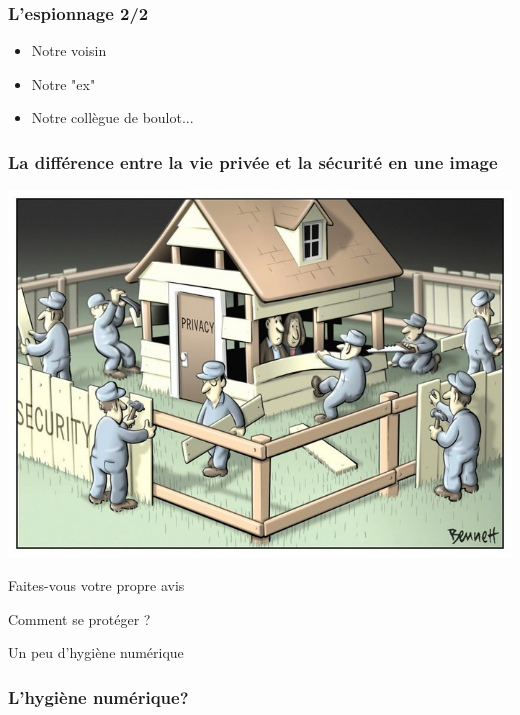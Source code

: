 \documentclass{beamer}
\begin{document}
\begin{frame}
\frametitle{L'espionnage 2/2}
\begin{itemize}
\item Notre voisin
\item Notre "ex"
\item Notre collègue de boulot...
\end{itemize}
\end{frame}

\begin{frame}
\frametitle{La différence entre la vie privée et la sécurité en une image}
\begin{center}
\includegraphics[scale=0.4]{./images/Security_Privacy.jpg}
\end{center}
\end{frame}

\begin{frame}
\Huge{\centerline{Faites-vous votre propre avis}}
\end{frame}


\begin{frame}
\Huge{\centerline{Comment se protéger ?}}
\Huge{\centerline{Un peu d'hygiène numérique}}
\end{frame}

\begin{frame}
\frametitle{L'hygiène numérique?}
\begin{block}{}
\end{block}
\end{frame}
\end{document}
